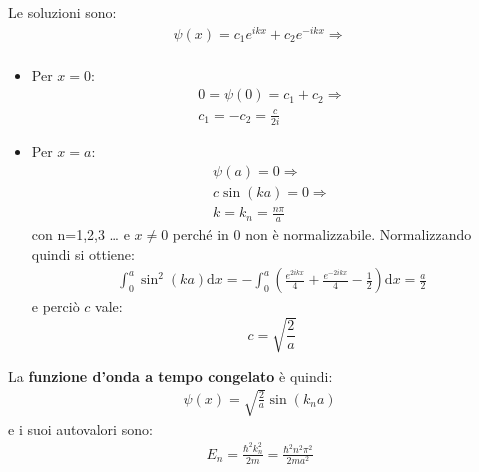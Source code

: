 Le soluzioni sono:
\begin{equation}\begin{split}
\psi \left(x\right)=c_1e^{ikx}+c_2e^{-ikx} \Longrightarrow \\
\end{split}\end{equation}
\begin{itemize}
\item Per $x=0$:
\begin{equation}\begin{split}
0=\psi \left(0\right)=c_1+c_2 \Longrightarrow \\
c_1=-c_2=\frac{c}{2i}
\end{split}\end{equation}
\item Per $x=a$:
\begin{equation}\begin{split}
\psi \left(a\right)=0 \Longrightarrow \\
c\sin{\left(ka\right)}=0 \Longrightarrow \\
k=k_n=\frac{n\pi }{a}
\end{split}\end{equation}
con {n=1,2,3 \dots} e $x\neq 0$ perché in $0$ non è normalizzabile.
Normalizzando quindi si ottiene:
\begin{equation}\begin{split}
\int_{0}^{a}{\sin^2{\left(ka\right)} \textrm{d}x}=-\int_{0}^{a}{\left(\frac{e^{2ikx}}{4}+\frac{e^{-2ikx}}{4}-\frac{1}{2}\right) \textrm{d}x}=\frac{a}{2}
\end{split}\end{equation}
e perciò $c$ vale:
\begin{equation}
c=\sqrt{\frac{2}{a}}
\end{equation}
\end{itemize}

La \textbf{funzione d'onda a tempo congelato} è quindi:
\begin{equation}\begin{split}
\psi \left(x\right)=\sqrt{\frac{2}{a}}\sin{\left(k_na\right)}
\end{split}\end{equation}
e i suoi autovalori sono:
\begin{equation}\begin{split}
E_n=\frac{\hbar ^2k^2_n}{2m}=\frac{\hbar ^2n^2\pi ^2}{2ma^2}
\end{split}\end{equation}

